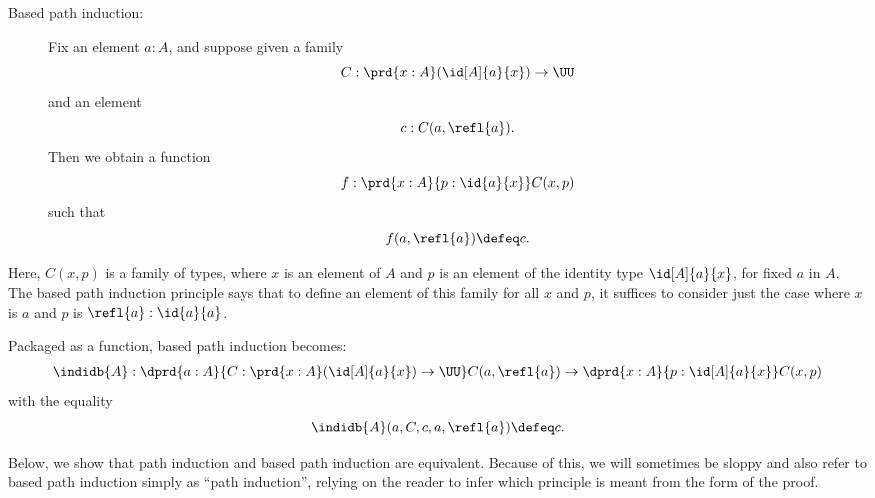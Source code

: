%
%
\begin{description}
\item[Based path induction:] 
  Fix an element $a:A$, and suppose given a family
  \[ C : \prd{x:A} (\id[A]{a}{x}) \to \UU \]
  and an element
  \[ c : C(a,\refl{a}). \]
  Then we obtain a function
  \[ f : \prd{x:A}{p:\id{a}{x}} C(x,p) \]
  such that
  \[ f(a,\refl{a}) \defeq c.\]
\end{description}

Here, $C(x,p)$ is a family of types, where $x$ is an element of $A$ and $p$ is an element of the identity type $\id[A]{a}{x}$, for fixed $a$ in $A$. The based path induction principle says that to define an element of this family for all $x$ and $p$, it suffices to consider
just the case where $x$ is $a$ and $p$ is $\refl{a} : \id{a}{a}$.

Packaged as a function, based path induction becomes:
%
\begin{align*}
  \indidb{A} :  \dprd{a:A}{C : \prd{x:A} (\id[A]{a}{x}) \to \UU}
  C(a,\refl{a}) \to \dprd{x:A}{p : \id[A]{a}{x}} C(x,p) 
\end{align*}
with the equality
\[ \indidb{A}(a,C,c,a,\refl{a}) \defeq c. \]

Below, we show that path induction and based path induction are equivalent.  Because of this, we will sometimes be sloppy and also refer to based path induction simply as ``path induction'', relying on the reader to infer which principle is meant from the form of the proof.

